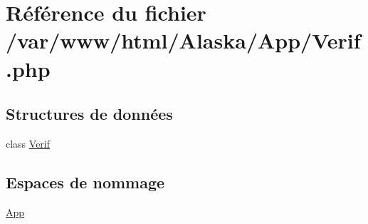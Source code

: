 \hypertarget{_verif_8php}{}\section{Référence du fichier /var/www/html/\+Alaska/\+App/\+Verif.php}
\label{_verif_8php}
\subsection*{Structures de données}
\begin{DoxyCompactItemize}
\item 
class \hyperlink{class_app_1_1_verif}{Verif}
\end{DoxyCompactItemize}
\subsection*{Espaces de nommage}
\begin{DoxyCompactItemize}
\item 
 \hyperlink{namespace_app}{App}
\end{DoxyCompactItemize}
